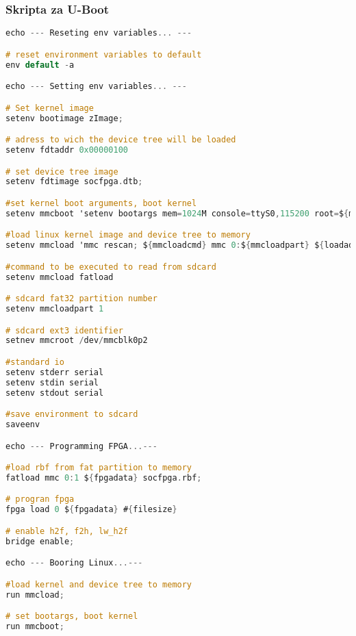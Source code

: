 \subsubsection{Skripta za U-Boot}
\begin{lstlisting}[language=C]
echo --- Reseting env variables... ---

# reset environment variables to default
env default -a

echo --- Setting env variables... ---

# Set kernel image
setenv bootimage zImage;

# adress to wich the device tree will be loaded
setenv fdtaddr 0x00000100

# set device tree image
setenv fdtimage socfpga.dtb;

#set kernel boot arguments, boot kernel
setenv mmcboot 'setenv bootargs mem=1024M console=ttyS0,115200 root=${mmcroot} rw rootwait; bootz ${loadaddr} - ${ftdaddr}';

#load linux kernel image and device tree to memory
setenv mmcload 'mmc rescan; ${mmcloadcmd} mmc 0:${mmcloadpart} ${loadaddr} ${bootimage}; ${mmcloadcmd} mmc 0:${mmcloadpart} ${fdtaddr} ${fdtimage}'

#command to be executed to read from sdcard
setenv mmcload fatload

# sdcard fat32 partition number
setenv mmcloadpart 1

# sdcard ext3 identifier
setnev mmcroot /dev/mmcblk0p2

#standard io
setenv stderr serial
setenv stdin serial
setenv stdout serial

#save environment to sdcard
saveenv

echo --- Programming FPGA...---

#load rbf from fat partition to memory
fatload mmc 0:1 ${fpgadata} socfpga.rbf;

# progran fpga
fpga load 0 ${fpgadata} #{filesize}

# enable h2f, f2h, lw_h2f
bridge enable;

echo --- Booring Linux...---

#load kernel and device tree to memory
run mmcload;

# set bootargs, boot kernel
run mmcboot;
\end{lstlisting}
